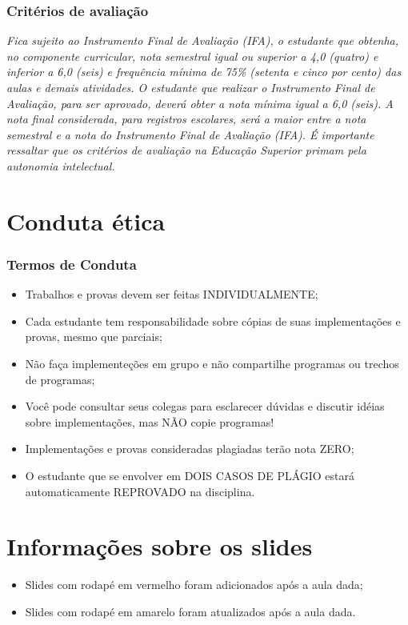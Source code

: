 \documentclass{beamer}
\begin{document}
\begin{frame}[fragile]\justifying
      \frametitle{Critérios de avaliação}
      \textit{Fica sujeito ao Instrumento Final de Avaliação (IFA), o estudante que obtenha, no componente curricular, nota semestral igual ou superior a
      4,0 (quatro) e inferior a 6,0 (seis) e frequência mínima de 75\% (setenta e cinco por cento) das aulas e demais atividades. O estudante que realizar o Instrumento Final de
      Avaliação, para ser aprovado, deverá obter a nota mínima igual a 6,0 (seis). A nota final considerada, para registros escolares, será a maior entre a nota semestral e a nota do
      Instrumento Final de Avaliação (IFA). 
      \newline
      \newline
      É importante ressaltar que os critérios de avaliação na Educação Superior primam pela autonomia intelectual.}
\end{frame}

\section{Conduta ética}
\begin{frame}
\frametitle{Termos de Conduta}
      \begin{itemize}
            \item Trabalhos e provas devem ser feitas INDIVIDUALMENTE;
            \item Cada estudante tem responsabilidade sobre cópias de suas implementações e provas, mesmo que parciais;
            \item Não faça implementeções em grupo e não compartilhe programas ou trechos de programas;
            \item Você pode consultar seus colegas para esclarecer dúvidas e discutir idéias sobre implementações, mas NÃO copie programas!
            \item Implementações e provas consideradas plagiadas terão nota ZERO;
            \item O estudante que se envolver em DOIS CASOS DE PLÁGIO estará automaticamente REPROVADO na disciplina.
      \end{itemize}
\end{frame}

\section{Informações sobre os slides}

\begin{frame}
      
      \begin{itemize}
            \item Slides com rodapé em vermelho foram adicionados após a aula dada;
            \item Slides com rodapé em amarelo foram atualizados  após a aula dada.
      \end{itemize}
\end{frame}

\footlinecolor{}

\backmatter
\end{document}
